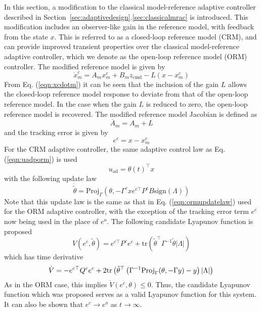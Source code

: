 \documentclass[]{../sty/aiaa-tc}
\begin{document}
  In this section, a modification to the classical model-reference adaptive controller described in Section~\ref{sec:adaptivedesign}.\ref{sec:classicalmrac} is introduced.
  This modification includes an observer-like gain in the reference model, with feedback from the state $x$.
  This is referred to as a closed-loop reference model (CRM), and can provide improved transient properties over the classical model-reference adaptive controller, which we denote as the open-loop reference model (ORM) controller.\cite{gibson.aiaacrm.2012,gibson.acc1.2013}
  The modified reference model is given by
  \begin{equation}
    \label{eqn:xcdotm}
    \dot{x}_{m}^{c}=A_{m}x_{m}^{c}+B_{m}z_{\text{cmd}}-L(x-x_{m}^{c})
  \end{equation}
  From Eq. (\ref{eqn:xcdotm}) it can be seen that the inclusion of the gain $L$ allows the closed-loop reference model response to deviate from that of the open-loop reference model.
  In the case when the gain $L$ is reduced to zero, the open-loop reference model is recovered.
  The modified reference model Jacobian is defined as
  \begin{equation}
    \label{eqn:ambar}
    \overline{A}_{m}=A_{m}+L
  \end{equation}
  and the tracking error is given by
  \begin{equation}
    \label{eqn:ecerror}
    e^{c}=x-x_{m}^{c}
  \end{equation}
  For the CRM adaptive controller, the same adaptive control law as Eq. (\ref{eqn:uadporm}) is used
  \begin{equation}
    \label{eqn:uadpcrm}
    u_{\text{ad}}=\theta(t)^{\top}x
  \end{equation}
  with the following update law
  \begin{equation}
    \label{eqn:crmupdatelaw}
    \dot{\tilde{\theta}}=\text{Proj}_{\Gamma}(\theta,-\Gamma^{c} xe^{c\top}P^{c}B\text{sign}(\Lambda))
  \end{equation}
  Note that this update law is the same as that in Eq. (\ref{eqn:ormupdatelaw}) used for the ORM adaptive controller, with the exception of the tracking error term $e^{c}$ now being used in the place of $e^{o}$.
  The following candidate Lyapunov function is proposed
  \begin{equation*}
    V(e^{c},\tilde{\theta})=e^{c\top}P^{c}e^{c}+\text{tr}\left(\tilde{\theta}^{\top}\Gamma^{-1}\tilde{\theta}|\Lambda|\right)
  \end{equation*}
  which has time derivative
  \begin{equation*}
    \dot{V}=-e^{c\top}Q^{c}e^{c}
    +2\text{tr}\left(\tilde{\theta}^{\top}\left(\Gamma^{-1}\text{Proj}_{\Gamma}(\theta,-\Gamma y)-y\right)|\Lambda|\right) \\
  \end{equation*}
  As in the ORM case, this implies $\dot{V}(e^{c},\theta)\leq 0$.
  Thus, the candidate Lyapunov function which was proposed serves as a valid Lyapunov function for this system.
  It can also be shown that $e^{c}\rightarrow e^{o}$ as $t\rightarrow\infty$.
\end{document}
